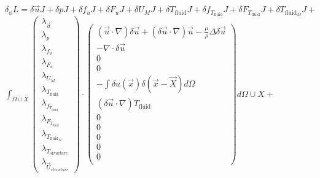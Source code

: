 \documentclass[10pt]{article} %
\begin{document}
\begin{center}
	$\delta_\phi L = \delta \vec{u} J + \delta p J + \delta f_u J + \delta F_u J + \delta U_M J +
	\delta T_{\text{fluid}} J + \delta f_{T_{\text{fluid}}} J + \delta F_{T_{\text{fluid}}} J + \delta T_{\text{fluid}_M} J +$\\
	$\int_{\Omega \cup X}
	\begin{pmatrix}
		\lambda_{\vec{u}} \\ \lambda_p \\ \lambda_{f_u} \\ \lambda_{F_u} \\ \lambda_{U_M}\\ \lambda_{T_{\text{fluid}}} \\ \lambda_{f_{T_{\text{fluid}}}} \\ \lambda_{F_{T_{\text{fluid}}}} \\ \lambda_{T_{\text{fluid}_M}} \\ \lambda_{T_{structure}} \\ \lambda_{\vec{U}_{structure}}
	\end{pmatrix}
	\cdot
	\begin{pmatrix}
		(\vec{u}\cdot\nabla) \delta{\vec{u}} + (\delta{\vec{u}}\cdot\nabla)\vec{u}-\frac{\mu}{\rho} \Delta \delta{\vec{u}} \\
		- \nabla \cdot \delta\vec{u}\\
		0 \\
		0 \\
		- \int \delta u(\vec{x}) \delta(\vec{x}-\vec{X}) d \Omega \\
		(\delta\vec{u} \cdot \nabla) T_{\text{fluid}} \\
		0\\
		0\\
		0\\
		0\\
		0\\
	\end{pmatrix}
	d\Omega \cup X + $\\


\end{center}
\end{document}
